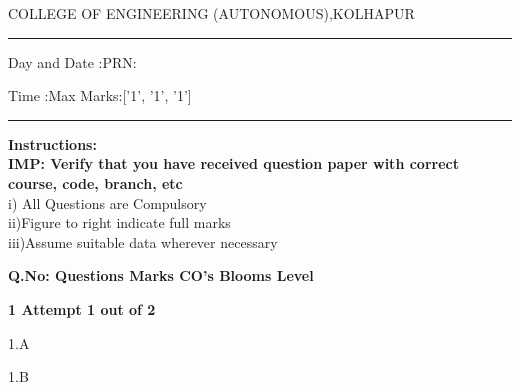 \documentclass[12pt]{article}
\begin{document}
	
\par
COLLEGE OF ENGINEERING (AUTONOMOUS),KOLHAPUR
\par\noindent\rule{\textwidth}{0.4pt}
\centering{}\par
\centering{}\par
{}\par
\begin{flushleft}
Day and Date :{}\hspace{3.5cm}PRN:
\end{flushleft}

\begin{flushleft}
Time :{}\hspace{3cm}Max Marks:{['1', '1', '1']}\\
\end{flushleft}
\noindent\rule{\textwidth}{0.1pt}
\begin{flushleft}
{\bf Instructions:}\\
{\hspace{0.5cm} \bf IMP: Verify that you have received question paper with correct course, code, branch, etc}\\
\hspace{1cm}i) All Questions are Compulsory\\
\hspace{1cm}ii)Figure to right indicate full marks\\
\hspace{1cm}iii)Assume suitable data wherever necessary\\
\end{flushleft} 

\begin{flushleft}
{\bf Q.No: \hspace{2.5cm} \bf Questions \hspace{0.25cm} \bf Marks \hspace{0.25cm} \bf CO's\hspace{0.25cm} \bf Blooms Level}	
\end{flushleft}

\begin{flushleft}
	\bf 1 \hspace{2cm} Attempt 1 out of 2\\  
\end{flushleft}	
\begin{flushleft}

	{1.A}\hspace{2cm}
	 \hspace{1cm}   \hspace{1cm}  \hspace{1cm} \par
\end{flushleft}	
\begin{flushleft}

	{1.B}\hspace{2cm}
	 \hspace{1cm}   \hspace{1cm}  \hspace{1cm} \par
\end{flushleft}	
\end{document}

